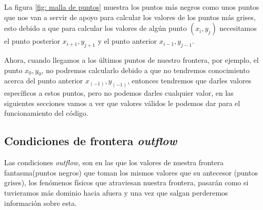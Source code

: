 \documentclass[12pt,a4paper]{book}
\begin{document}
La figura \ref{fig: malla de puntos} muestra los puntos más negros como unos puntos que nos van a servir de apoyo para calcular los valores de los puntos más grises, esto debido a que para calcular los valores de algún punto $(x_i, y_j)$ necesitamos el punto posterior $x_{i+1}, y_{j+1}$ y el punto anterior $x_{i-1}, y_{j-1}$.

Ahora, cuando llegamos a los últimos puntos de nuestro frontera, por ejemplo, el punto $x_{0}, y_{0}$, no podremos calcularlo debido a que no tendremos conocimiento acerca del punto anterior $x_{(-1)}, y_{(-1)}$, entonces tendremos que darles valores específicos a estos puntos, pero no podemos darles cualquier valor, en las siguientes secciones vamos a ver que valores válidos le podemos dar para el funcionamiento del código. 

\subsection{Condiciones de frontera \emph{outflow}}

Las condiciones \emph{outflow}, son en las que los valores de nuestra frontera fantasma(puntos negros) que toman los  mismos valores que su antecesor (puntos grises), los fenómenos físicos que atraviesan nuestra frontera, pasarán como si tuvieramos más dominio hacia afuera y una vez que salgan perderemos información sobre esta.
\end{document}
